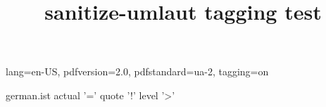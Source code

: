 \DocumentMetadata
  {
    lang=en-US,
    pdfversion=2.0,
    pdfstandard=ua-2,
    tagging=on
  }
\begin{filecontents}{german.ist}
actual '=' %
quote '!' %
level '>' %
\end{filecontents}
\documentclass[a4paper,12pt]{article}
\usepackage[T1]{fontenc}
\usepackage[ngerman]{babel}
\usepackage{makeidx}
\usepackage{sanitize-umlaut}
\usepackage[hyperindex,colorlinks]{hyperref}
\makeindex

\title{sanitize-umlaut tagging test}


\section{Basic Example}
Test äöüÄÖÜß.
\index{Aber} \index{Arg} \index{Ärger}
\index{Ofen} \index{Ö - wie schön} \index{oberhalb}
\index{Ufer} \index{Übermaß}
\index{Latex=\LaTeX} \index{Ärger>Index}
Test äöüÄÖÜß.
\printindex
